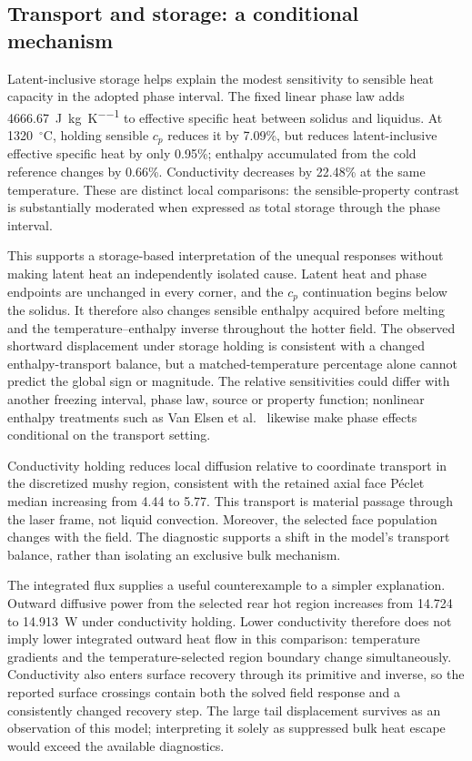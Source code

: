 \subsection{Transport and storage: a conditional mechanism}
Latent-inclusive storage helps explain the modest sensitivity to sensible heat capacity in the adopted phase interval. The fixed linear phase law adds 4666.67~\si{\joule\per\kilogram\per\kelvin} to effective specific heat between solidus and liquidus. At 1320~$^\circ$C, holding sensible $c_p$ reduces it by 7.09\%, but reduces latent-inclusive effective specific heat by only 0.95\%; enthalpy accumulated from the cold reference changes by 0.66\%. Conductivity decreases by 22.48\% at the same temperature. These are distinct local comparisons: the sensible-property contrast is substantially moderated when expressed as total storage through the phase interval.

This supports a storage-based interpretation of the unequal responses without making latent heat an independently isolated cause. Latent heat and phase endpoints are unchanged in every corner, and the $c_p$ continuation begins below the solidus. It therefore also changes sensible enthalpy acquired before melting and the temperature--enthalpy inverse throughout the hotter field. The observed shortward displacement under storage holding is consistent with a changed enthalpy-transport balance, but a matched-temperature percentage alone cannot predict the global sign or magnitude. The relative sensitivities could differ with another freezing interval, phase law, source or property function; nonlinear enthalpy treatments such as Van Elsen et al.~\cite{vanelsen2007} likewise make phase effects conditional on the transport setting.

Conductivity holding reduces local diffusion relative to coordinate transport in the discretized mushy region, consistent with the retained axial face P\'eclet median increasing from 4.44 to 5.77. This transport is material passage through the laser frame, not liquid convection. Moreover, the selected face population changes with the field. The diagnostic supports a shift in the model's transport balance, rather than isolating an exclusive bulk mechanism.

The integrated flux supplies a useful counterexample to a simpler explanation. Outward diffusive power from the selected rear hot region increases from 14.724 to 14.913~W under conductivity holding. Lower conductivity therefore does not imply lower integrated outward heat flow in this comparison: temperature gradients and the temperature-selected region boundary change simultaneously. Conductivity also enters surface recovery through its primitive and inverse, so the reported surface crossings contain both the solved field response and a consistently changed recovery step. The large tail displacement survives as an observation of this model; interpreting it solely as suppressed bulk heat escape would exceed the available diagnostics.

